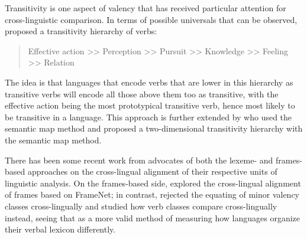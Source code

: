 Transitivity is one aspect of valency that has received particular attention for cross-linguistic comparison. In terms of possible universals that can be observed, \citet{tsunoda1981, tsunoda1985} proposed a transitivity hierarchy of verbs:
\begin{quote}
    Effective action >> Perception >> Pursuit >> Knowledge >> Feeling >> Relation
\end{quote}
The idea is that languages that encode verbs that are lower in this hierarchy as transitive verbs will encode all those above them too as transitive, with the effective action being the most prototypical transitive verb, hence most likely to be transitive in a language. This approach is further extended by \citet{malchukov2005} who used the semantic map method and proposed a two-dimensional transitivity hierarchy with the semantic map method. 

There has been some recent work from advocates of both the lexeme- and frames-based approaches on the cross-lingual alignment of their respective units of linguistic analysis. On the frames-based side, \citet{baker2020, ellsworth2021} explored the cross-lingual alignment of frames based on FrameNet; in contrast, \citet{say2014} rejected the equating of minor valency classes cross-lingually and studied how verb classes compare cross-lingually instead, seeing that as a more valid method of measuring how languages organize their verbal lexicon differently.
